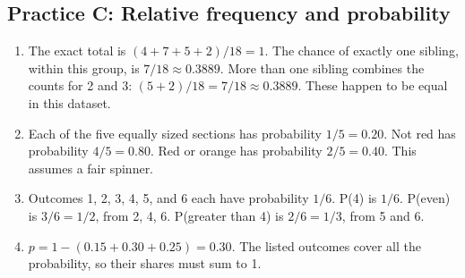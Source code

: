 \documentclass[12pt,letterpaper]{article}
\begin{document}
\subsection*{Practice C: Relative frequency and probability}
\begin{enumerate}[label=C\arabic*.,leftmargin=2.5em,itemsep=10pt]
\item \par{}\par\medskip
The exact total is $(4+7+5+2)/18=1$. The chance of exactly one sibling, within this group, is $7/18\approx0.3889$. More than one sibling combines the counts for 2 and 3: $(5+2)/18=7/18\approx0.3889$. These happen to be equal in this dataset.
\item Each of the five equally sized sections has probability $1/5=0.20$. Not red has probability $4/5=0.80$. Red or orange has probability $2/5=0.40$. This assumes a fair spinner.
\item Outcomes 1, 2, 3, 4, 5, and 6 each have probability $1/6$. P(4) is $1/6$. P(even) is $3/6=1/2$, from 2, 4, 6. P(greater than 4) is $2/6=1/3$, from 5 and 6.
\item $p=1-(0.15+0.30+0.25)=0.30$. The listed outcomes cover all the probability, so their shares must sum to 1.
\end{enumerate}
\end{document}
